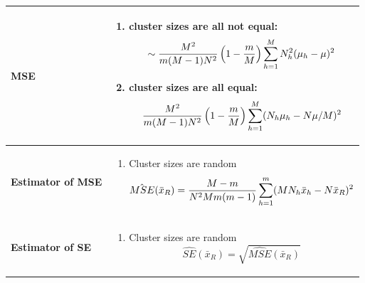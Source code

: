 \begin{longtable}{|p{5cm}|p{9cm}|}
    \textbf{MSE} & \begin{minipage}{8cm}
        \vspace{0.2cm}
        \begin{enumerate}
            \item cluster sizes are all not equal:
            \[
                \sim\dfrac{M^2}{m(M-1)N^2}
                \left(1- \dfrac{m}{M} \right)
                \displaystyle\sum_{h=1}^{M}
                N_h^2(\mu_h - \mu)^2
            \]

            \item cluster sizes are all equal:
            \[
                \dfrac{M^2}{m(M-1)N^2}
                \left(1- \dfrac{m}{M} \right)
                \displaystyle\sum_{h=1}^{M}
                (N_h\mu_h - N\mu/M)^2
            \]
        \end{enumerate}
        \vspace{0.01cm}
    \end{minipage}\\
    \hline

    \textbf{Estimator of MSE} & \begin{minipage}{8cm}
        \vspace{0.2cm}
        \begin{enumerate}
            \item Cluster sizes are random
            \[
                \hat{MSE}(\bar{x}_R) =
                \dfrac{M-m}{N^2Mm(m-1)}
                \displaystyle\sum_{h=1}^{m}
                (MN_h\bar{x}_h - N\bar{x}_R)^2
            \]
        \end{enumerate}
        \vspace{0.1cm}
    \end{minipage}\\
    \hline

    \textbf{Estimator of SE} & \begin{minipage}{8cm}
        \vspace{0.2cm}
        \begin{enumerate}
            \item Cluster sizes are random
            \[
                \hat{SE}(\bar{x}_R) =
                \sqrt{\hat{MSE}(\bar{x}_R)}
            \]
        \end{enumerate}
        \vspace{0.1cm}
    \end{minipage}\\
    \hline
\end{longtable}

